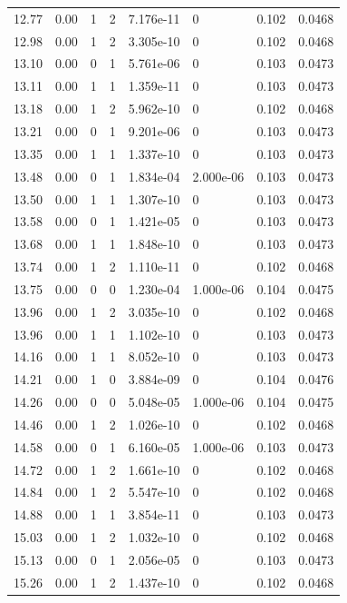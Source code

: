 \documentclass[preview]{standalone}
\begin{document}
{{{{\begin{tabular}{L{1.2cm}C{1.2cm} C{0.3cm}C{0.5cm} C{1.4cm}C{1.4cm} C{1.4cm}C{1.4cm}}
  12.77  &  0.00  & 1     &  2 &  7.176e-11  & 0  & 0.102 &  0.0468   \\ 
  12.98  &  0.00  & 1     &  2 &  3.305e-10  & 0  & 0.102 &  0.0468   \\ 
  13.10  &  0.00  & 0     &  1 &  5.761e-06  & 0  & 0.103 &  0.0473   \\ 
  13.11  &  0.00  & 1     &  1 &  1.359e-11  & 0  & 0.103 &  0.0473   \\ 
  13.18  &  0.00  & 1     &  2 &  5.962e-10  & 0  & 0.102 &  0.0468   \\ 
  13.21  &  0.00  & 0     &  1 &  9.201e-06  & 0  & 0.103 &  0.0473   \\ 
  13.35  &  0.00  & 1     &  1 &  1.337e-10  & 0  & 0.103 &  0.0473   \\ 
  13.48  &  0.00  & 0     &  1 &  1.834e-04  & 2.000e-06  & 0.103 &  0.0473   \\ 
  13.50  &  0.00  & 1     &  1 &  1.307e-10  & 0  & 0.103 &  0.0473   \\ 
  13.58  &  0.00  & 0     &  1 &  1.421e-05  & 0  & 0.103 &  0.0473   \\ 
  13.68  &  0.00  & 1     &  1 &  1.848e-10  & 0  & 0.103 &  0.0473   \\ 
  13.74  &  0.00  & 1     &  2 &  1.110e-11  & 0  & 0.102 &  0.0468   \\ 
  13.75  &  0.00  & 0     &  0 &  1.230e-04  & 1.000e-06  & 0.104 &  0.0475   \\ 
  13.96  &  0.00  & 1     &  2 &  3.035e-10  & 0  & 0.102 &  0.0468   \\ 
  13.96  &  0.00  & 1     &  1 &  1.102e-10  & 0  & 0.103 &  0.0473   \\ 
  14.16  &  0.00  & 1     &  1 &  8.052e-10  & 0  & 0.103 &  0.0473   \\ 
  14.21  &  0.00  & 1     &  0 &  3.884e-09  & 0  & 0.104 &  0.0476   \\ 
  14.26  &  0.00  & 0     &  0 &  5.048e-05  & 1.000e-06  & 0.104 &  0.0475   \\ 
  14.46  &  0.00  & 1     &  2 &  1.026e-10  & 0  & 0.102 &  0.0468   \\ 
  14.58  &  0.00  & 0     &  1 &  6.160e-05  & 1.000e-06  & 0.103 &  0.0473   \\ 
  14.72  &  0.00  & 1     &  2 &  1.661e-10  & 0  & 0.102 &  0.0468   \\ 
  14.84  &  0.00  & 1     &  2 &  5.547e-10  & 0  & 0.102 &  0.0468   \\ 
  14.88  &  0.00  & 1     &  1 &  3.854e-11  & 0  & 0.103 &  0.0473   \\ 
  15.03  &  0.00  & 1     &  2 &  1.032e-10  & 0  & 0.102 &  0.0468   \\ 
  15.13  &  0.00  & 0     &  1 &  2.056e-05  & 0  & 0.103 &  0.0473   \\ 
  15.26  &  0.00  & 1     &  2 &  1.437e-10  & 0  & 0.102 &  0.0468   \\ 
\hline 
\end{tabular} 

}}}}
\end{document}
